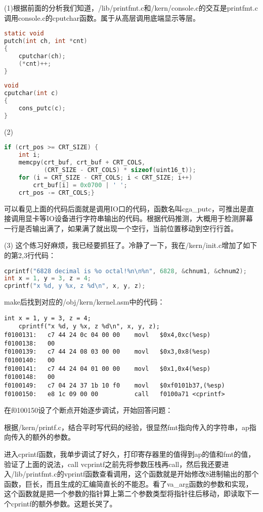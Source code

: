\documentclass[a4paper, 11pt]{ctexart}
\begin{document}
(1)根据前面的分析我们知道，/lib/printfmt.c和/kern/console.c的交互是printfmt.c调用console.c的cputchar函数。属于从高层调用底端显示等层。
\begin{lstlisting}[language={C}]
static void
putch(int ch, int *cnt)
{
	cputchar(ch);
    (*cnt)++;
}
\end{lstlisting}

\begin{lstlisting}[language={C}]
void
cputchar(int c)
{
	cons_putc(c);
}
\end{lstlisting}

(2)
\begin{lstlisting}[language={C}]
if (crt_pos >= CRT_SIZE) {
    int i;
    memcpy(crt_buf, crt_buf + CRT_COLS,
           (CRT_SIZE - CRT_COLS) * sizeof(uint16_t));
    for (i = CRT_SIZE - CRT_COLS; i < CRT_SIZE; i++)
        crt_buf[i] = 0x0700 | ' ';
    crt_pos -= CRT_COLS;}
\end{lstlisting}

可以看见上面的代码后面就是调用IO口的代码，函数名叫cga\_putc，可推出是直接调用显卡等IO设备进行字符串输出的代码。根据代码推测，大概用于检测屏幕一行是否输出满了，如果满了就出现一个空行，当前位置移动到空行行首。

(3)
这个练习好麻烦，我已经要抓狂了。冷静了一下，我在/kern/init.c增加了如下的第2,3行代码：
\begin{lstlisting}[language={C}]
cprintf("6828 decimal is %o octal!%n\n%n", 6828, &chnum1, &chnum2);
int x = 1, y = 3, z = 4;
cprintf("x %d, y %x, z %d\n", x, y, z);
\end{lstlisting}

make后找到对应的/obj/kern/kernel.asm中的代码：
\begin{lstlisting}[language={[x86masm]Assembler}]
	int x = 1, y = 3, z = 4;
	cprintf("x %d, y %x, z %d\n", x, y, z);
f0100131:	c7 44 24 0c 04 00 00 	movl   $0x4,0xc(%esp)
f0100138:	00 
f0100139:	c7 44 24 08 03 00 00 	movl   $0x3,0x8(%esp)
f0100140:	00 
f0100141:	c7 44 24 04 01 00 00 	movl   $0x1,0x4(%esp)
f0100148:	00 
f0100149:	c7 04 24 37 1b 10 f0 	movl   $0xf0101b37,(%esp)
f0100150:	e8 1c 09 00 00       	call   f0100a71 <cprintf>
\end{lstlisting}

在f0100150设了个断点开始逐步调试，开始回答问题：

根据/kern/printf.c，结合平时写代码的经验，很显然fmt指向传入的字符串，ap指向传入的额外的参数。

进入cprintf函数，我单步调试了好久，打印寄存器里的值得到ap的值和fmt的值，验证了上面的说法，call vcprintf之前先将参数压栈再call，然后我还要进入/lib/printfmt.c的vprintf函数查看调用，这个函数就是开始修改8进制输出的那个函数，巨长，而且生成的汇编简直长的不能忍。看了va\_arg函数的参数和实现，这个函数就是把一个参数的指针算上第二个参数类型将指针往后移动，即读取下一个cprintf的额外参数。这题长哭了。
\end{document}
